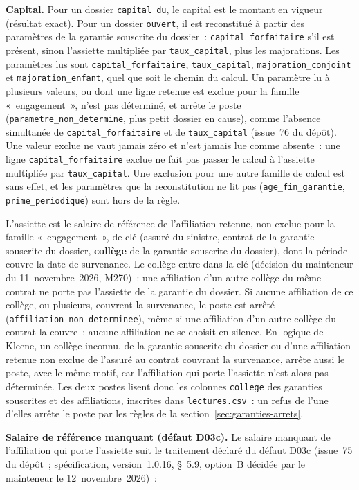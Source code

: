 \documentclass[a4paper,11pt]{article}
\newcommand{\code}[1]{\texttt{\small #1}}
\begin{document}
\textbf{Capital.} Pour un dossier \code{capital\_du}, le capital est le
montant en vigueur (résultat exact). Pour un dossier \code{ouvert}, il est
reconstitué à partir des paramètres de la garantie souscrite du
dossier~: \code{capital\_forfaitaire} s'il est présent, sinon l'assiette
multipliée par \code{taux\_capital}, plus les majorations. Les paramètres
lus sont \code{capital\_forfaitaire}, \code{taux\_capital},
\code{majoration\_conjoint} et \code{majoration\_enfant}, quel que soit le
chemin du calcul. Un paramètre lu à plusieurs valeurs, ou dont une ligne
retenue est exclue pour la famille «~engagement~», n'est pas déterminé, et
arrête le poste (\code{parametre\_non\_determine}, plus petit dossier en
cause), comme l'absence simultanée de \code{capital\_forfaitaire} et de
\code{taux\_capital} (issue~76 du dépôt). Une valeur exclue ne vaut jamais
zéro et n'est jamais lue comme absente~: une ligne
\code{capital\_forfaitaire} exclue ne fait pas passer le calcul à
l'assiette multipliée par \code{taux\_capital}. Une exclusion pour une
autre famille de calcul est sans effet, et les paramètres que la
reconstitution ne lit pas (\code{age\_fin\_garantie},
\code{prime\_periodique}) sont hors de la règle.

L'assiette est le salaire de référence de l'affiliation retenue, non
exclue pour la famille «~engagement~», de clé (assuré du sinistre, contrat
de la garantie souscrite du dossier, \textbf{collège} de la garantie
souscrite du dossier), dont la période couvre la date de survenance. Le
collège entre dans la clé (décision du mainteneur du 11~novembre~2026,
M270)~: une affiliation d'un autre collège du même contrat ne porte pas
l'assiette de la garantie du dossier. Si aucune affiliation de ce collège,
ou plusieurs, couvrent la survenance, le poste est arrêté
(\code{affiliation\_non\_determinee}), même si une affiliation d'un autre
collège du contrat la couvre~: aucune affiliation ne se choisit en
silence. En logique de Kleene, un collège inconnu, de la garantie souscrite
du dossier ou d'une affiliation retenue non exclue de l'assuré au contrat
couvrant la survenance, arrête aussi le poste, avec le même motif, car
l'affiliation qui porte l'assiette n'est alors pas déterminée. Les deux
postes lisent donc les colonnes \code{college} des garanties souscrites et
des affiliations, inscrites dans \code{lectures.csv}~: un refus de l'une
d'elles arrête le poste par les règles de la section~\ref{sec:garanties-arrets}.

\textbf{Salaire de référence manquant (défaut D03c).} Le salaire manquant
de l'affiliation qui porte l'assiette suit le traitement déclaré du défaut
D03c (issue~75 du dépôt~; spécification, version~1.0.16, §~5.9, option~B
décidée par le mainteneur le 12~novembre~2026)~:
\end{document}
